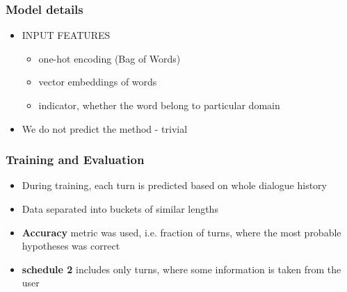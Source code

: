 \begin{frame}
\frametitle{Model details}
\begin{itemize}
\item INPUT FEATURES
\begin{itemize}
\item one-hot encoding (Bag of Words)
\item vector embeddings of words
\item indicator, whether the word belong to particular domain 
\end{itemize}
\item We do not predict the method - trivial
\end{itemize}
\end{frame}

\begin{frame}
\frametitle{Training and Evaluation}
\begin{itemize}
\item During training, each turn is predicted based on whole dialogue history
\item Data separated into buckets of similar lengths 
\item \textbf{Accuracy} metric was used, i.e. fraction of turns, where the most probable hypotheses was correct
\item \textbf{schedule 2} includes only turns, where some information is taken from the user
\end{itemize}
\end{frame}